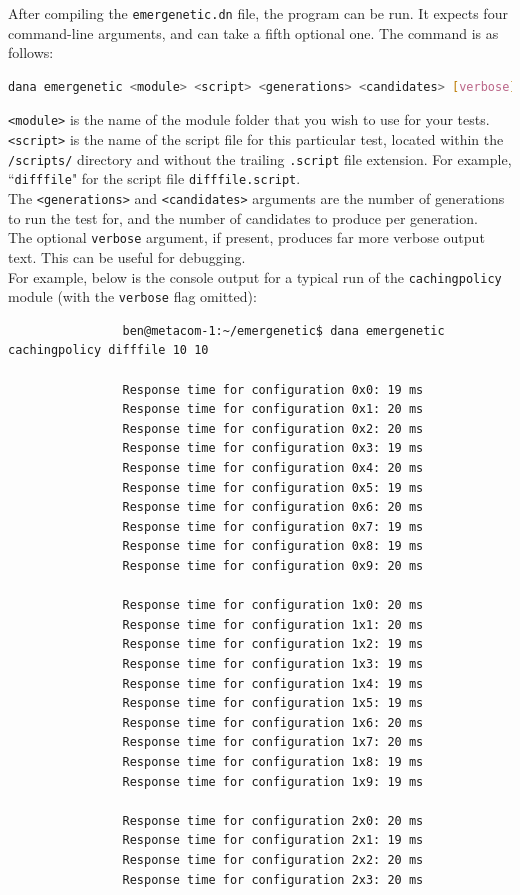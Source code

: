 \documentclass[compsoc,12pt,a4paper]{IEEEtran}
\begin{document}
			After compiling the \lstinline|emergenetic.dn| file, the program can be run. It expects four command-line arguments, and can take a fifth optional one. The command is as follows:
			\begin{lstlisting}[language=bash]
				dana emergenetic <module> <script> <generations> <candidates> [verbose]
			\end{lstlisting}
			\lstinline|<module>| is the name of the module folder that you wish to use for your tests.\\
			\lstinline|<script>| is the name of the script file for this particular test, located within the \lstinline|/scripts/| directory and without the trailing \lstinline|.script| file extension. For example, ``\lstinline|difffile|" for the script file \lstinline|difffile.script|.\\
			The \lstinline|<generations>| and \lstinline|<candidates>| arguments are the number of generations to run the test for, and the number of candidates to produce per generation.\\
			The optional \lstinline|verbose| argument, if present, produces far more verbose output text. This can be useful for debugging.\\
			For example, below is the console output for a typical run of the \lstinline|cachingpolicy| module (with the \lstinline|verbose| flag omitted):
			\begin{lstlisting}
				ben@metacom-1:~/emergenetic$ dana emergenetic cachingpolicy difffile 10 10
	
				Response time for configuration 0x0: 19 ms
				Response time for configuration 0x1: 20 ms
				Response time for configuration 0x2: 20 ms
				Response time for configuration 0x3: 19 ms
				Response time for configuration 0x4: 20 ms
				Response time for configuration 0x5: 19 ms
				Response time for configuration 0x6: 20 ms
				Response time for configuration 0x7: 19 ms
				Response time for configuration 0x8: 19 ms
				Response time for configuration 0x9: 20 ms
				
				Response time for configuration 1x0: 20 ms
				Response time for configuration 1x1: 20 ms
				Response time for configuration 1x2: 19 ms
				Response time for configuration 1x3: 19 ms
				Response time for configuration 1x4: 19 ms
				Response time for configuration 1x5: 19 ms
				Response time for configuration 1x6: 20 ms
				Response time for configuration 1x7: 20 ms
				Response time for configuration 1x8: 19 ms
				Response time for configuration 1x9: 19 ms
				
				Response time for configuration 2x0: 20 ms
				Response time for configuration 2x1: 19 ms
				Response time for configuration 2x2: 20 ms
				Response time for configuration 2x3: 20 ms
			\end{lstlisting}
\end{document}
